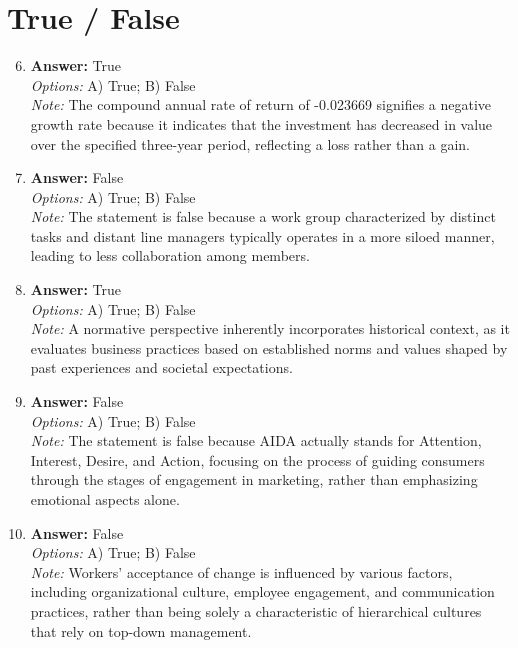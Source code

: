 \documentclass[12pt]{article}
\begin{document}
\section*{True / False}
\begin{enumerate}[label=\arabic*.]
\setcounter{enumi}{5}
\item \textbf{Answer:} True
\\ \textit{Options:} A) True; B) False
\\ \textit{Note:} The compound annual rate of return of -0.023669 signifies a negative growth rate because it indicates that the investment has decreased in value over the specified three-year period, reflecting a loss rather than a gain.
\item \textbf{Answer:} False
\\ \textit{Options:} A) True; B) False
\\ \textit{Note:} The statement is false because a work group characterized by distinct tasks and distant line managers typically operates in a more siloed manner, leading to less collaboration among members.
\item \textbf{Answer:} True
\\ \textit{Options:} A) True; B) False
\\ \textit{Note:} A normative perspective inherently incorporates historical context, as it evaluates business practices based on established norms and values shaped by past experiences and societal expectations.
\item \textbf{Answer:} False
\\ \textit{Options:} A) True; B) False
\\ \textit{Note:} The statement is false because AIDA actually stands for Attention, Interest, Desire, and Action, focusing on the process of guiding consumers through the stages of engagement in marketing, rather than emphasizing emotional aspects alone.
\item \textbf{Answer:} False
\\ \textit{Options:} A) True; B) False
\\ \textit{Note:} Workers' acceptance of change is influenced by various factors, including organizational culture, employee engagement, and communication practices, rather than being solely a characteristic of hierarchical cultures that rely on top-down management.
\end{enumerate}
\end{document}
